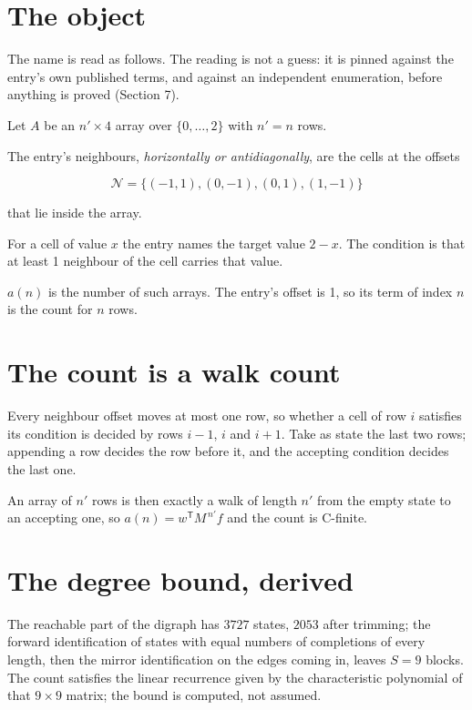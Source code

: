 \documentclass[11pt]{article}
\theoremstyle{definition}
\begin{document}
\section{The object}

The name is read as follows. The reading is not a guess: it is pinned against the entry's own published terms, and against an independent enumeration, before anything is proved (Section 7).

Let $A$ be an $n' \times 4$ array over $\{0,\dots,2\}$ with $n' = n$ rows.

The entry's neighbours, {\itshape horizontally or antidiagonally}, are the cells at the offsets

\[\mathcal{N} = \{(-1,1), (0,-1), (0,1), (1,-1)\}\]

that lie inside the array.

For a cell of value $x$ the entry names the target value $2 - x$. The condition is that at least 1 neighbour of the cell carries that value.

$a(n)$ is the number of such arrays. The entry's offset is 1, so its term of index $n$ is the count for $n$ rows.

\section{The count is a walk count}

Every neighbour offset moves at most one row, so whether a cell of row $i$ satisfies its condition is decided by rows $i-1$, $i$ and $i+1$. Take as state the last two rows; appending a row decides the row before it, and the accepting condition decides the last one.

An array of $n'$ rows is then exactly a walk of length $n'$ from the empty state to an accepting one, so $a(n) = w^{\mathsf T}M^{\,n'}f$ and the count is C-finite.

\section{The degree bound, derived}

The reachable part of the digraph has $3727$ states, $2053$ after trimming; the forward identification of states with equal numbers of completions of every length, then the mirror identification on the edges coming in, leaves $S = 9$ blocks. The count satisfies the linear recurrence given by the characteristic polynomial of that $9\times9$ matrix; the bound is computed, not assumed.
\end{document}
